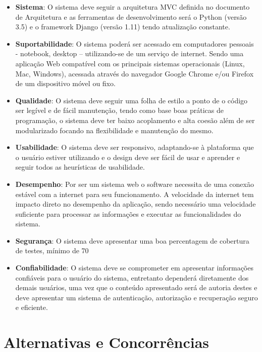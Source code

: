 \begin{itemize}
  \item \textbf{Sistema}: O sistema deve seguir a arquitetura MVC definida no documento de Arquitetura e as ferramentas de desenvolvimento será o Python (versão 3.5) e o framework Django (versão 1.11) tendo atualização constante.
  \item \textbf{Suportabilidade}: O sistema poderá ser acessado em computadores pessoais - notebook, desktop – utilizando-se de um serviço de internet. Sendo uma aplicação Web compatível com os principais sistemas operacionais (Linux, Mac, Windows), acessada através do navegador Google Chrome e/ou Firefox de um dispositivo móvel ou fixo.
  \item \textbf{Qualidade}: O sistema deve seguir uma folha de estilo a ponto de o código ser legível e de fácil manutenção, tendo como base boas práticas de programação, o sistema deve ter baixo acoplamento e alta coesão além de ser modularizado focando na flexibilidade e manutenção do mesmo.
  \item \textbf{Usabilidade}: O sistema deve ser responsivo, adaptando-se à plataforma que o usuário estiver utilizando e o design deve ser fácil de usar e aprender e seguir todos as heurísticas de usabilidade.
  \item \textbf{Desempenho}: Por ser um sistema web o software necessita de uma conexão estável com a internet para seu funcionamento. A velocidade da internet tem impacto direto no desempenho da aplicação, sendo necessário uma velocidade suficiente para processar as informações e executar as funcionalidades do sistema.
  \item \textbf{Segurança}: O sistema deve apresentar uma boa percentagem de cobertura de testes, mínimo de 70%
  \item \textbf{Confiabilidade}: O sistema deve se comprometer em apresentar informações confiáveis para o usuário do sistema, entretanto dependerá diretamente dos demais usuários, uma vez que o conteúdo apresentado será de autoria destes e deve apresentar um sistema de autenticação, autorização e recuperação seguro e eficiente.
\end{itemize}

\section{Alternativas e Concorrências}

